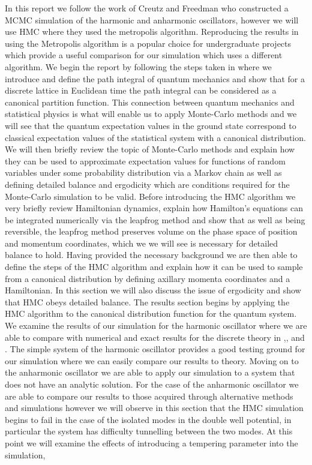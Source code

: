 \documentclass[12pt]{article}
\begin{document}
 In this report we follow the work of Creutz and Freedman \cite{creutz_freedman_1981} who constructed a MCMC simulation of the harmonic and anharmonic oscillators, however we will use HMC where they used the metropolis algorithm. Reproducing the results in \cite{creutz_freedman_1981} using the Metropolis algorithm is a popular choice for undergraduate projects \cite{westbroek_king_vvedensky_durr_2017} \cite{rodgers_raes} \cite{slapik_serenone} which provide a useful comparison for our simulation which uses a different algorithm. We begin the report by following the steps taken in \cite{creutz_freedman_1981} where we introduce and define the path integral of quantum mechanics and show that for a discrete lattice in Euclidean time the path integral can be considered as a canonical partition function. This connection between quantum mechanics and statistical physics is what will enable us to apply Monte-Carlo methods and we will see that the quantum expectation values in the ground state correspond to classical expectation values of the statistical system with a canonical distribution. We will then briefly review the topic of Monte-Carlo methods and explain how they can be used to approximate expectation values for functions of random variables under some probability distribution via a Markov chain as well as defining detailed balance and ergodicity which are conditions required for the Monte-Carlo simulation to be valid. Before introducing the HMC algorithm we very briefly review Hamiltonian dynamics, explain how Hamilton's equations can be integrated numerically via the leapfrog method and show that as well as being reversible, the leapfrog method preserves volume on the phase space of position and momentum coordinates, which we we will see is necessary for detailed balance to hold. Having provided the necessary background we are then able to define the steps of the HMC algorithm and explain how it can be used to sample from a canonical distribution by defining axillary momenta coordinates and a Hamiltonian. In this section we will also discuss the issue of ergodicity and show that HMC obeys detailed balance. The results section begins by applying the HMC algorithm to the canonical distribution function for the quantum system. We examine the results of our simulation for the harmonic oscillator where we are able to compare with numerical and exact results for the discrete theory in \cite{creutz_freedman_1981},\cite{westbroek_king_vvedensky_durr_2017}, \cite{rodgers_raes} and \cite{slapik_serenone}. The simple system of the harmonic oscillator provides a good testing ground for our simulation where we can easily compare our results to theory. Moving on to the anharmonic oscillator we are able to apply our simulation to a system that does not have an analytic solution. For the case of the anharmonic oscillator we are able to compare our results to those acquired through alternative methods \cite{blankenbecler_degrand_sugar_1980} and simulations \cite{rodgers_raes} however we will observe in this section that the HMC simulation begins to fail in the case of the isolated modes in the double well potential, in particular the system has difficulty tunnelling between the two modes. At this point we will examine the effects of introducing a tempering parameter into the simulation, 
\end{document}

